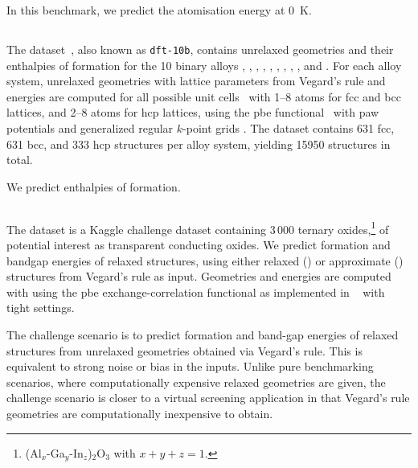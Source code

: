 In this benchmark, we predict the atomisation energy at \qty{0}{K}.

\subsection{\dsba}

The \dsba{} dataset~\cite{nrwh2019q}, also known as \texttt{dft-10b}, contains unrelaxed geometries and their enthalpies of formation for the 10 binary alloys , , , , , , , , , and .
For each alloy system, unrelaxed geometries with lattice parameters from Vegard's rule \cite{v1921p,da1991p} and energies are computed for all possible unit cells~\cite{hf2008p} with 1--8 atoms for \gls{fcc} and \gls{bcc} lattices, and 2--8 atoms for \gls{hcp} lattices, 
using the \gls{pbe} functional~\cite{pbe1996p} with \gls{paw} potentials and generalized regular $k$-point grids \cite{wmm2016p,mjhh2018p}.
The dataset contains \num{631} \gls{fcc}, \num{631} \gls{bcc}, and \num{333} \gls{hcp} structures per alloy system, yielding \num{15950} structures in total. 

We predict enthalpies of formation.

\subsection{\dstco}

The \dstco{} dataset \cite{sgzs2019q} is a Kaggle challenge \cite{kaggle} dataset containing 3\,000 ternary oxides,\footnote{(Al$_x$-Ga$_y$-In$_z$)$_2$O$_3$ with $x+y+z=1$.} of potential interest as transparent conducting oxides.
We predict formation and bandgap energies of relaxed structures, using either relaxed (\dstcor) or approximate (\dstcou) structures from Vegard's rule as input.
Geometries and energies are computed with \dft using the \gls{pbe} exchange-correlation functional as implemented in \aims~\cite{FHI-aims} with tight settings.

The challenge scenario is to predict formation and band-gap energies of relaxed structures from unrelaxed geometries obtained via Vegard's rule.
This is equivalent to strong noise or bias in the inputs.
Unlike pure benchmarking scenarios, where computationally expensive relaxed geometries are given, the challenge scenario is closer to a virtual screening application in that Vegard's rule geometries are computationally inexpensive to obtain.

